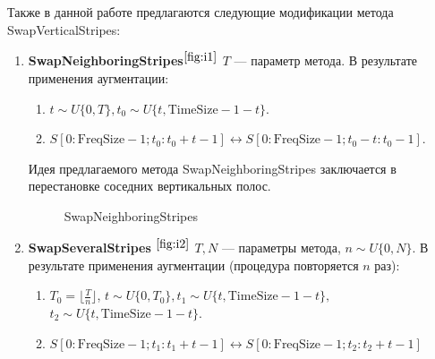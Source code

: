 \documentclass[12pt, fleqn]{article}
\begin{document}
Также в данной работе предлагаются следующие модификации метода \newline
SwapVerticalStripes:

\begin{enumerate}
    \item \textbf{SwapNeighboringStripes}$^{\ref{fig:i1}}$ \newline
        $T$ --- параметр метода. В результате применения аугментации:
        \begin{enumerate}
            \item $t \sim U\{0, T\}, t_0 \sim U\{t, \text{TimeSize} - 1 - t\}.$
            \item $S[0:\text{FreqSize} - 1; t_0: t_0 + t - 1] \leftrightarrow S[0:\text{FreqSize} - 1; t_0 - t: t_0 - 1].$
        \end{enumerate}
        Идея предлагаемого метода SwapNeighboringStripes заключается в перестановке соседних вертикальных полос.
    	\begin{figure}[ht!]
    	\caption{SwapNeighboringStripes}
    	\label{fig:i1}
        \end{figure}
    \item \textbf{SwapSeveralStripes} $^{\ref{fig:i2}}$ \newline
        $T, N$ --- параметры метода, \newline
        $n \sim U\{0, N\}$. \newline
    	В результате применения аугментации (процедура повторяется $n$ раз):
    	\begin{enumerate}
    	    \item $T_0 = \lfloor \frac{T}{n} \rfloor$, $t \sim U\{0, T_0\}, t_1 \sim U\{t, \text{TimeSize} - 1 - t\},$ \newline $t_2 \sim U\{t, \text{TimeSize} - 1 - t\}$.
    	    \item $S[0:\text{FreqSize} - 1; t_1: t_1 + t - 1] \leftrightarrow S[0:\text{FreqSize} - 1; t_2 : t_2 + t - 1]$

\end{enumerate}
\end{enumerate}
\end{document}
